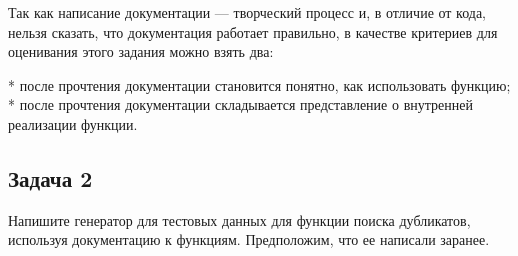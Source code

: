 \documentclass[letterpaper,10pt,russian]{sphinxmanual}
\begin{document}
\begin{sphinxVerbatim}[commandchars=\\\{\}]
   
        
      
        
            
\end{sphinxVerbatim}

\sphinxAtStartPar
{}

\sphinxAtStartPar
Так как написание документации — творческий процесс и, в отличие от кода, нельзя сказать, что документация работает правильно, в качестве критериев для оценивания этого задания можно взять два:

\begin{sphinxVerbatim}[commandchars=\\\{\}]
* после прочтения документации становится понятно, как использовать функцию;
* после прочтения документации складывается представление о внутренней реализации функции.
\end{sphinxVerbatim}


\subsection{Задача 2}
\label{\detokenize{educational_materials/docs/exercises:id3}}
\sphinxAtStartPar
Напишите генератор для тестовых данных для функции поиска дубликатов, используя документацию к функциям. Предположим, что ее написали заранее.
\end{document}
